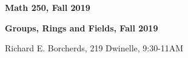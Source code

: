 \documentclass[12pt,letterpaper]{article}
\begin{document}
\thispagestyle{empty}
$ $
\vfill
\begin{center}

\centerline{\huge \textbf{Math 250, Fall 2019}}
\centerline{\Large \textbf{Groups, Rings and Fields, Fall 2019}} 
\centerline{Richard E. Borcherds, 219 Dwinelle, 9:30-11AM}
\end{center}
\vfill
$ $
\newpage
\thispagestyle{empty}
\tableofcontents
\newpage
\setcounter{page}{1}

\end{document}

